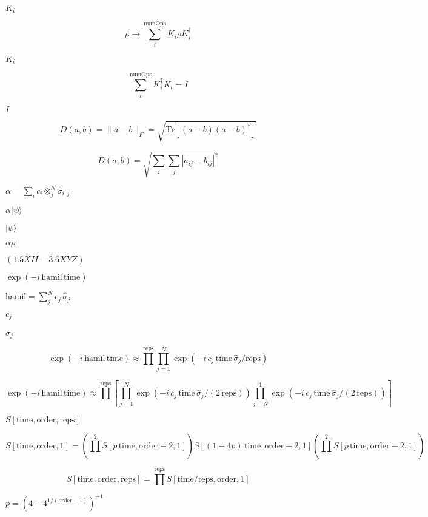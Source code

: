 \documentclass{article}
\begin{document}
$K_i$
\pagebreak

\[
 \rho \to \sum\limits_i^{\text{numOps}} K_i \rho K_i^\dagger
\]
\pagebreak

$ K_i $
\pagebreak

\[
 \sum \limits_i^{\text{numOps}} K_i^\dagger K_i = I
\]
\pagebreak

$ I $
\pagebreak

\[
 D(a, b) = \| a - b \|_F = \sqrt{  \text{Tr}[ (a-b)(a-b)^\dagger ]   }
\]
\pagebreak

\[
 D(a, b) = \sqrt{ \sum\limits_i \sum\limits_j | a_{ij} - b_{ij} |^2 }
\]
\pagebreak

$ \alpha = \sum_i c_i \otimes_j^{N} \hat{\sigma}_{i,j} $
\pagebreak

$ \alpha | \psi \rangle $
\pagebreak

$ |\psi\rangle $
\pagebreak

$\alpha \rho$
\pagebreak

$ (1.5 X I I - 3.6 X Y Z) $
\pagebreak

$ \exp(-i \, \text{hamil} \, \text{time}) $
\pagebreak

$ \text{hamil} = \sum_j^N c_j \, \hat \sigma_j $
\pagebreak

$c_j$
\pagebreak

$\hat \sigma_j$
\pagebreak

\[
  \exp(-i \, \text{hamil} \, \text{time})
     \approx 
   \prod\limits^{\text{reps}} \prod\limits_{j=1}^{N} \exp(-i \, c_j \, \text{time} \, \hat\sigma_j / \text{reps})
\]
\pagebreak

\[
  \exp(-i \, \text{hamil} \, \text{time})
     \approx 
   \prod\limits^{\text{reps}} \left[
        \prod\limits_{j=1}^{N} \exp(-i \, c_j \, \text{time} \, \hat\sigma_j / (2 \, \text{reps}))
         \prod\limits_{j=N}^{1} \exp(-i \, c_j \, \text{time} \, \hat\sigma_j / (2 \, \text{reps}))
    \right]
\]
\pagebreak

$ S[\text{time}, \text{order}, \text{reps}] $
\pagebreak

\[
     S[\text{time}, \text{order}, 1] = 
         \left( \prod\limits^2 S[p \, \text{time}, \text{order}-2, 1] \right)
         S[ (1-4p)\,\text{time}, \text{order}-2, 1]
         \left( \prod\limits^2 S[p \, \text{time}, \text{order}-2, 1] \right)
\]
\pagebreak

\[
     S[\text{time}, \text{order}, \text{reps}] = 
         \prod\limits^{\text{reps}} S[\text{time}/\text{reps}, \text{order}, 1]
\]
\pagebreak

$ p = \left( 4 - 4^{1/(\text{order}-1)} \right)^{-1} $
\pagebreak
\end{document}
